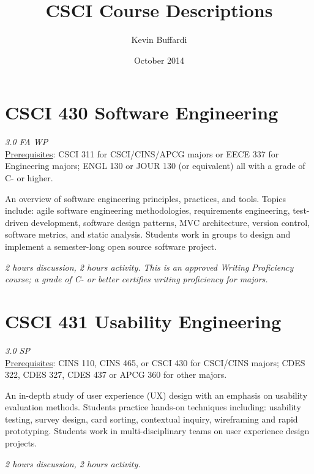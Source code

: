 \documentclass[12pt]{article}
\title{CSCI Course Descriptions}
\author{Kevin Buffardi}
\date{October 2014}
\begin{document}
  \maketitle
  \section*{CSCI 430 Software Engineering}	 	
  \textit{3.0 FA WP} \\
  \underline{Prerequisites}: CSCI 311 for CSCI/CINS/APCG majors or EECE 337 for Engineering majors; ENGL 130 or JOUR 130 (or equivalent) all with a grade of C- or higher.

  An overview of software engineering principles, practices, and tools. Topics include: agile software engineering methodologies, requirements engineering, test-driven development, software design patterns, MVC architecture, version control, software metrics, and static analysis. Students work in groups to design and implement a semester-long open source software project. 

  \textit{2 hours discussion, 2 hours activity. This is an approved Writing Proficiency course; a grade of C- or better certifies writing proficiency for majors.}
  
  \section*{CSCI 431 Usability Engineering}
  \textit{3.0 SP} \\
  \underline{Prerequisites}: CINS 110, CINS 465, or CSCI 430 for CSCI/CINS majors; CDES 322, CDES 327, CDES 437 or APCG 360 for other majors.

  An in-depth study of user experience (UX) design with an emphasis on usability evaluation methods. Students practice hands-on techniques including: usability testing, survey design, card sorting, contextual inquiry, wireframing and rapid prototyping. Students work in multi-disciplinary teams on user experience design projects.

  \textit{2 hours discussion, 2 hours activity.}



\end{document}
